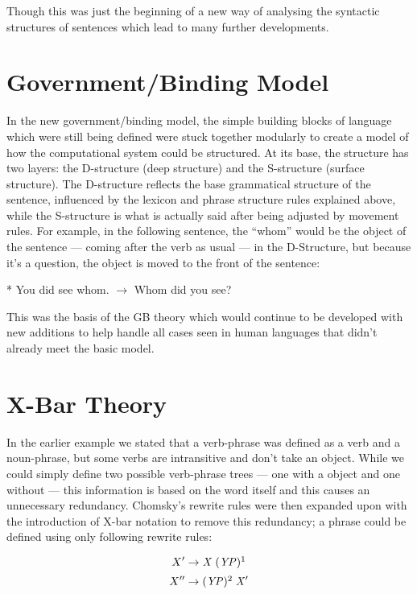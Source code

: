 \documentclass[a4paper,10pt]{article}
\newcommand{\mli}[1]{\mathit{#1}}
\begin{document}
Though this was just the beginning of a new way of analysing the syntactic structures of sentences
which lead to many further developments.


\section{Government/Binding Model}
In the new government/binding model, the simple building blocks of language which were still being
defined were stuck together modularly to create a model of how the computational system could be
structured. At its base, the structure has two layers: the D-structure (deep structure) and the
S-structure (surface structure). The D-structure reflects the base grammatical structure of the
sentence, influenced by the lexicon and phrase structure rules explained above, while the S-structure
is what is actually said after being adjusted by movement rules. \citep[p.~61]{ChUGAI}
For example, in the following sentence, the ``whom'' would be the object of the sentence --- coming
after the verb as usual --- in the D-Structure, but because it's a question, the object is moved
to the front of the sentence:

\begin{center}
	* You did see whom. $\rightarrow$ Whom did you see?
\end{center}

This was the basis of the GB theory which would continue to be developed with new additions to
help handle all cases seen in human languages that didn't already meet the basic model.


\section{X-Bar Theory}
In the earlier example we stated that a verb-phrase was defined as a verb and a noun-phrase, but
some verbs are intransitive and don't take an object. While we could simply define two possible
verb-phrase trees --- one with a object and one without --- this information is based on the word
itself and this causes an unnecessary redundancy. Chomsky's rewrite rules were then expanded upon
with the introduction of X-bar notation to remove this redundancy; a phrase could be defined using
only following rewrite rules:

\[ X'  \rightarrow  \mli{X}   \; (\mli{YP})\footnotemark[1] \]
\[ X'' \rightarrow (\mli{YP})\footnotemark[2] \;  \mli{X'}  \]

\end{document}
